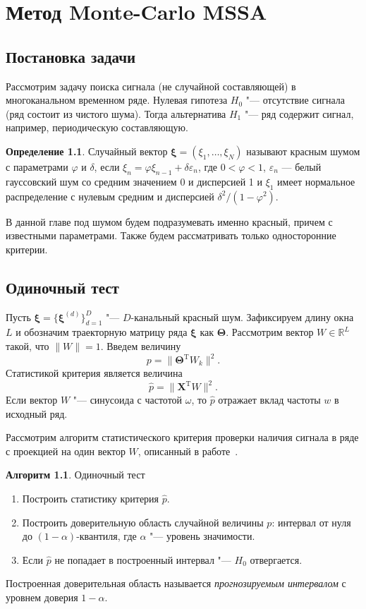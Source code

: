 \documentclass[specialist,
substylefile = spbu_report.rtx,
subf,href,colorlinks=true, 12pt]{disser}
\newcommand{\traj}{\mathbf{X}}
\newcommand{\transponse}{^\mathrm{T}}
\theoremstyle{definition}
\newtheorem{definition}{Определение}
\newtheorem{algorithm}{Алгоритм}
\newcommand{\R}{\mathbb{R}}
\newcommand{\bfxi}{\boldsymbol{\xi}}
\begin{document}
	\chapter{Метод Monte-Carlo MSSA}
	\section{Постановка задачи}
	Рассмотрим задачу поиска сигнала (не случайной составляющей) в многоканальном временном ряде. Нулевая гипотеза $H_0$ "--- отсутствие сигнала (ряд состоит из чистого шума). Тогда альтернатива $H_1$ "--- ряд содержит сигнал, например, периодическую составляющую.
	\begin{definition}
		Случайный вектор $\boldsymbol{\xi}=(\xi_1,\dots,\xi_N)$ называют красным шумом с параметрами $\varphi$ и $\delta$, если $\xi_n = \varphi\xi_{n-1} + \delta\varepsilon_n$, где $0<\varphi<1$, $\varepsilon_n$ — белый гауссовский шум со средним значением 0 и дисперсией 1 и $\xi_1$ имеет нормальное распределение с нулевым средним и дисперсией $\delta^2/(1-\varphi^2)$.
	\end{definition}
	В данной главе под шумом будем подразумевать именно красный, причем с известными параметрами.  Также будем рассматривать только односторонние критерии.
	\section{Одиночный тест}
	Пусть $\bfxi=\{\bfxi^{(d)}\}_{d=1}^D$ "--- $D$-канальный красный шум. Зафиксируем длину окна $L$ и обозначим траекторную матрицу ряда $\boldsymbol{\xi}$ как $\mathbf\Theta$. Рассмотрим вектор $W\in \R^{L}$ такой, что $\|W\|=1$. Введем величину
	\[
	p=\|\mathbf{\Theta}\transponse W_k\|^2.
	\]
	Статистикой критерия является величина
	\[
	\widehat{p}=\|\traj\transponse W\|^2.
	\]
	Если вектор $W$ "--- синусоида с частотой $\omega$, то $\widehat{p}$ отражает вклад частоты $w$ в исходный ряд.
	
	Рассмотрим алгоритм статистического критерия проверки наличия сигнала в ряде с проекцией на один вектор $W$, описанный в работе~\cite{Golyandina_2023}.
	\begin{algorithm}{Одиночный тест~\cite{Golyandina_2023}}
		\begin{enumerate}
			\item Построить статистику критерия $\widehat p$.
			\item Построить доверительную область случайной величины $p$: интервал от нуля до $(1-\alpha)$-квантиля, где $\alpha$ "--- уровень значимости.
			\item Если $\widehat p$	не попадает в построенный интервал "--- $H_0$ отвергается. 
		\end{enumerate}
	\end{algorithm}
	Построенная доверительная область называется \textit{прогнозируемым интервалом} с уровнем доверия $1-\alpha$.
	
\end{document}
